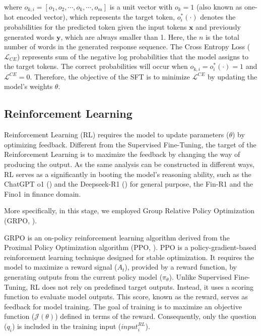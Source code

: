 where $o_{k,i} = [o_1, o_2, \cdots, o_k, \cdots, o_m]$ is a unit vector with $o_k = 1$ (also known as one-hot encoded vector), which represents the target token, $o^*_i(\cdot)$ denotes the probabilities for the predicted token given the input tokens $\bm{x}$ and previously generated words $\bm{y}$, which are always smaller than 1. Here, the $n$ is the total number of words in the generated response sequence. The Cross Entropy Loss ($\mathcal{L}_{CE}$) represents sum of the negative log probabilities that the model assigns to the target tokens. The correct probabilities will occur when $o_{k,i}=o^*_i(\cdot) = 1$ and $\mathcal{L}^{CE}=0$. Therefore, the objective of the SFT is to minimize $\mathcal{L}^{CE}$ by updating the model's weights $\theta$.  






\subsection{Reinforcement Learning}

Reinforcement Learning (RL) requires the model to update parameters ($\theta$) by optimizing feedback. Different from the Supervised Fine-Tuning, the target of the Reinforcement Learning is to maximize the feedback by changing the way of producing the output. As the same analysis can be constructed in different ways, RL serves as a significantly in booting the model's reasoning ability, such as the ChatGPT o1 (\cite{jaech2024openai}) and the Deepseek-R1 (\cite{guo2025deepseek}) for general purpose, the Fin-R1 \cite{liu2025fin} and the Fino1 \cite{qian2025fino1} in finance domain.

More specifically, in this stage, we employed Group Relative Policy Optimization (GRPO, \cite{shao2024deepseekmath}).

GRPO is an on-policy reinforcement learning algorithm derived from the Proximal Policy Optimization algorithm (PPO, \cite{schulman2017proximal}). PPO is a policy-gradient-based reinforcement learning technique designed for stable optimization. It requires the model to maximize a reward signal ($A_t$), provided by a reward function, by generating outputs from the current policy model ($\pi_{\theta}$). Unlike Supervised Fine-Tuning, RL does not rely on predefined target outputs. Instead, it uses a scoring function to evaluate model outputs. This score, known as the reward, serves as feedback for model training. The goal of training is to maximize an objective function ($\mathcal{J}(\theta)$) defined in terms of the reward. Consequently, only the question ($q_i$) is included in the training input ($input^{RL}_i$).


